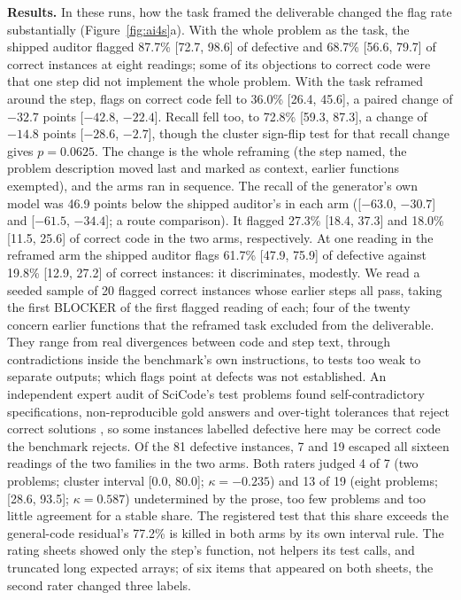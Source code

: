 \textbf{Results.} In these runs, how the task framed the deliverable changed the flag rate
substantially (Figure~\ref{fig:ai4s}a). With the whole problem as the task, the shipped auditor
flagged 87.7\% [72.7, 98.6] of defective and 68.7\% [56.6, 79.7] of correct instances at eight
readings; some of its objections to correct code were that one step did not implement the whole
problem. With the task reframed around the step, flags on correct code fell to 36.0\% [26.4, 45.6], a
paired change of $-32.7$ points [$-42.8$, $-22.4$]. Recall fell too, to 72.8\% [59.3, 87.3], a
change of $-14.8$ points [$-28.6$, $-2.7$], though the cluster sign-flip test for that recall change
gives $p = 0.0625$. The change is the whole reframing (the step named, the problem description moved last
and marked as context, earlier functions exempted), and the arms ran in sequence. The recall of the
generator's own model was 46.9 points below the shipped auditor's in each arm ([$-63.0$, $-30.7$] and
[$-61.5$, $-34.4$]; a route comparison). It flagged 27.3\% [18.4, 37.3] and 18.0\% [11.5, 25.6] of
correct code in the two arms, respectively.
At one reading in the reframed arm the shipped auditor flags 61.7\% [47.9, 75.9] of defective against
19.8\% [12.9, 27.2] of correct instances: it discriminates, modestly. We read a seeded sample of 20 flagged correct instances whose earlier steps all pass, taking the first BLOCKER of the first flagged reading of each; four of the twenty concern earlier functions that the reframed task excluded from the deliverable. They range from real divergences between code and step text, through
contradictions inside the benchmark's own instructions, to tests too weak to separate outputs; which
flags point at defects was not established. An independent expert audit of SciCode's test problems found self-contradictory
specifications, non-reproducible gold answers and over-tight tolerances that reject correct solutions
\citep{hu2026scicodeverified}, so some instances labelled defective here may be correct code the
benchmark rejects. Of the 81 defective instances, 7 and 19 escaped all sixteen readings of
the two families in the two arms. Both raters judged 4 of 7 (two problems; cluster interval [0.0, 80.0]; $\kappa = -0.235$) and 13 of 19 (eight problems; [28.6, 93.5]; $\kappa = 0.587$) undetermined by the prose, too few problems and too little agreement for a stable share. The registered test that this share exceeds the general-code residual's 77.2\% is killed in both arms by its own interval rule. The rating sheets showed only the step's function, not helpers its test calls, and truncated long expected arrays; of six items that appeared on both sheets, the second rater changed three labels.

